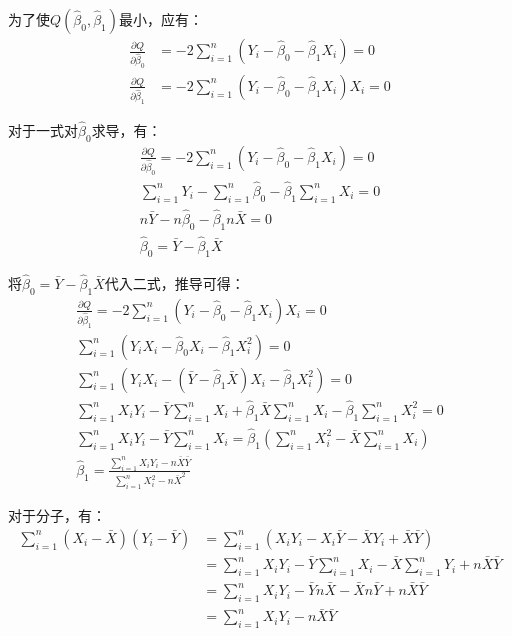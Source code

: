 \documentclass[11pt]{article}
\begin{document}
为了使$Q(\hat{\beta}_0,\hat{\beta}_1)$最小，应有：
\begin{align*}
    \frac{\partial Q}{\partial \hat{\beta}_0} &= -2 \sum_{i=1}^{n} \left( Y_i - \hat{\beta}_0 - \hat{\beta}_1 X_i \right) = 0 \\
    \frac{\partial Q}{\partial \hat{\beta}_1} &= -2 \sum_{i=1}^{n} \left( Y_i - \hat{\beta}_0 - \hat{\beta}_1 X_i \right) X_i = 0
\end{align*}

对于一式对$\hat{\beta}_0$求导，有：
\begin{gather*}
    \frac{\partial Q}{\partial \hat{\beta}_0} = -2 \sum_{i=1}^{n} \left( Y_i - \hat{\beta}_0 - \hat{\beta}_1 X_i \right) = 0 \\
    \sum_{i=1}^{n} Y_i - \sum_{i=1}^{n} \hat{\beta}_0 - \hat{\beta}_1 \sum_{i=1}^{n} X_i = 0 \\
    n \bar{Y} - n \hat{\beta}_0  - \hat{\beta}_1 n \bar{X} = 0 \\
    \hat{\beta}_0 = \bar{Y} - \hat{\beta}_1 \bar{X}
\end{gather*}

将$\hat{\beta}_0 = \bar{Y} - \hat{\beta}_1 \bar{X}$代入二式，推导可得：
\begin{gather*}
    \frac{\partial Q}{\partial \hat{\beta}_1} = -2 \sum_{i=1}^{n} \left( Y_i - \hat{\beta}_0 - \hat{\beta}_1 X_i \right) X_i = 0 \\
    \sum_{i=1}^{n} \left( Y_i X_i - \hat{\beta}_0 X_i - \hat{\beta}_1 X_i^2 \right) = 0 \\
    \sum_{i=1}^{n} \left( Y_i X_i - (\bar{Y} - \hat{\beta}_1 \bar{X}) X_i - \hat{\beta}_1 X_i^2 \right) = 0 \\
    \sum_{i=1}^{n} X_i Y_i - \bar{Y} \sum_{i=1}^{n} X_i + \hat{\beta}_1 \bar{X} \sum_{i=1}^{n} X_i - \hat{\beta}_1 \sum_{i=1}^{n} X_i^2 = 0 \\
    \sum_{i=1}^{n} X_i Y_i - \bar{Y} \sum_{i=1}^{n} X_i = \hat{\beta}_1 \left( \sum_{i=1}^{n} X_i^2 - \bar{X} \sum_{i=1}^{n} X_i \right) \\
    \hat{\beta}_1 = \frac{\sum_{i=1}^{n} X_i Y_i - n \bar{X} \bar{Y}}{\sum_{i=1}^{n} X_i^2 - n \bar{X}^2}
\end{gather*}

对于分子，有：
\begin{align*}
    \sum_{i=1}^{n} \left(X_i - \bar{X}\right) \left(Y_i - \bar{Y}\right)
    &= \sum_{i=1}^{n} \left( X_i Y_i - X_i\bar{Y} - \bar{X}Y_i + \bar{X}\bar{Y} \right) \\
    &=\sum_{i=1}^{n} X_i Y_i - \bar{Y} \sum_{i=1}^{n} X_i - \bar{X} \sum_{i=1}^{n} Y_i + n\bar{X}\bar{Y} \\
    &=\sum_{i=1}^{n} X_i Y_i - \bar{Y} n \bar{X} - \bar{X} n \bar{Y} + n\bar{X}\bar{Y} \\
    &=\sum_{i=1}^{n} X_i Y_i - n\bar{X}\bar{Y}
\end{align*}
\end{document}
